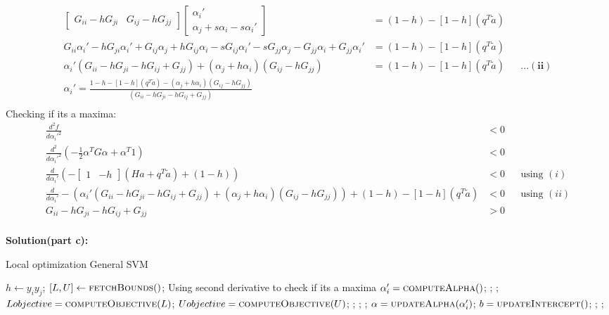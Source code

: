 \documentclass[10pt]{article}
\begin{document}
\begin{align*}
\begin{bmatrix}	G_{ii}-hG_{ji}&G_{ij}-hG_{jj} \end{bmatrix} \begin{bmatrix}	\alpha_{i}'\\ \alpha_{j}+s\alpha_{i} -s\alpha_{i}' \end{bmatrix} &= (1-h) - [1 -h](q^T\tilde{a})\\
G_{ii}\alpha_{i}'-hG_{ji}\alpha_{i}'+G_{ij}\alpha_{j}+hG_{ij}\alpha_{i}-sG_{ij}\alpha_{i}'-sG_{jj}\alpha_{j} - G_{jj}\alpha_{i} +G_{jj}\alpha_{i}' &= (1-h) - [1 -h](q^T\tilde{a})\\
\alpha_{i}'(G_{ii}-hG_{ji}-hG_{ij}+G_{jj}) + (\alpha_{j}+h\alpha_{i}) (G_{ij}-hG_{jj}) &= (1-h) - [1 -h](q^T\tilde{a}) && \mathbf{...(ii)}\\
\boxed{\alpha_{i}' = \frac{1-h - [1 -h](q^T\tilde{a}) - (\alpha_{j}+h\alpha_{i}) (G_{ij}-hG_{jj})}{(G_{ii}-hG_{ji}-hG_{ij}+G_{jj})}}\\
\end{align*}
Checking if its a maxima:
\begin{align*}
\frac{d^2f}{d\alpha_{i}'^2} &< 0\\
\frac{d^2}{d\alpha_{i}'^2} (-\frac{1}{2} \alpha^T G \alpha + \alpha^T 1) &< 0\\
\frac{d}{d\alpha_{i}'} (-\begin{bmatrix} 1&-h \end{bmatrix} (Ha+q^T\tilde{a}) + (1-h)) &< 0 && \text{using $(i)$}\\
\frac{d}{d\alpha_{i}'}-(\alpha_{i}'(G_{ii}-hG_{ji}-hG_{ij}+G_{jj}) + (\alpha_{j}+h\alpha_{i}) (G_{ij}-hG_{jj})) + (1-h) - [1 -h](q^T\tilde{a}) &< 0 && \text{using $(ii)$}\\
G_{ii}-hG_{ji}-hG_{ij}+G_{jj} &> 0\\
\end{align*}

\newpage

\textbf{Solution(part c):}

\begin{algorithm}
	\caption{Local optimization General SVM}\label{euclid}
	\begin{algorithmic}[1]
		\State $h \gets y_{i}y_{j}$;
		\State $[L,U] \gets \Call {fetchBounds}$;
		 \Comment Using second derivative to check if its a maxima
		\State $\alpha_{i}' = \Call {computeAlpha}$;
			;
			\Else
			;
			\EndIf
		\Else
		\State $Lobjective = \Call {computeObjective}{L}$;
		\State $Uobjective = \Call {computeObjective}{U}$;
			;
			\Else
			;
			\EndIf
		\EndIf
		;
		\State $\alpha = \Call {updateAlpha}{\alpha_{i}'}$;
		\State $b = \Call {updateIntercept}$;
		;
		\Else
		;
		\EndIf
		\EndProcedure
	\end{algorithmic}
\end{algorithm}
\end{document}

